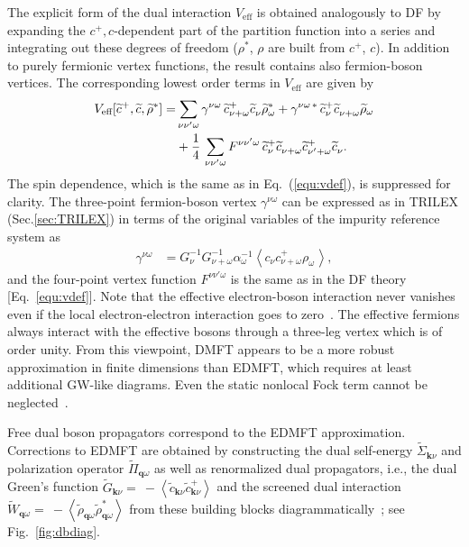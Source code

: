 \documentclass[rmp,aps,reprint,amsmath,amssymb,superscriptaddress,showpacs,nofootinbib]{revtex4-1}
\newcommand{\kv}{\ensuremath{\mathbf{k}}}
\newcommand{\qv}{\ensuremath{\mathbf{q}}}
\newcommand{\av}[1]{\ensuremath{\left\langle #1 \right\rangle}}
\begin{document}
The explicit form of the dual interaction $V_{\text{eff}}$ is obtained analogously to DF by expanding the $c^{+}, c$-dependent part of the partition function into a series and integrating out these degrees of freedom ($\rho^*$, $\rho$ are built from  $c^+$, $c$). In addition to purely fermionic vertex functions, the result contains also fermion-boson vertices. The corresponding lowest order terms in $V_{\text{eff}}$ are given by 
\begin{align}
  V_{\text{eff}}[\widetilde{c}^+,\widetilde{c},\widetilde{\rho}^*]
  =&\sum_{\nu\nu'\omega}\gamma^{\nu\omega}\,\widetilde{c}^+_{\nu+\omega}\widetilde{c}^{\phantom{*}}_{\nu} \widetilde{\rho}^{*}_{\omega} + \gamma^{\nu\omega\,*}\,\widetilde{c}^+_{\nu}\widetilde{c}^{\phantom{*}}_{\nu+\omega} \widetilde{\rho}_{\omega} \notag \\
  & +\frac14\,\sum_{\nu\nu'\omega}F^{\nu\nu'\omega}\,\widetilde{c}^{+}_{\nu}\widetilde{c}^{\phantom{*}}_{\nu+\omega}\widetilde{c}^{+}_{\nu'+\omega}\widetilde{c}^{\phantom{*}}_{\nu}.
\end{align}
The spin dependence, which is the same as in Eq.~(\ref{equ:vdef}), is suppressed for clarity. The three-point fermion-boson vertex $\gamma^{\nu\omega}$ can be expressed as in TRILEX (Sec.\ref{sec:TRILEX}) in terms of the original variables of the impurity reference system as~\cite{Ayral2016,Rohringer2016}
\begin{align}
\label{eq:3pvertex}
  \gamma^{\nu\omega}&=G^{-1}_{\nu}G^{-1}_{\nu+\omega}\alpha^{-1}_{\omega}\av{c^{\phantom{*}}_{\nu}c^{+}_{\nu+\omega}\rho^{\phantom{+}}_{\omega}},
\end{align}
and the four-point vertex function $F^{\nu\nu'\omega}$ is the same as in the DF theory [Eq.~\eqref{equ:vdef}].
Note that the effective electron-boson interaction never vanishes even if the local electron-electron interaction goes to zero~\cite{vanLoon2014a}. The effective fermions always interact with the effective bosons through a three-leg vertex which is of order unity. From this viewpoint, DMFT appears to be a more robust approximation in finite dimensions than EDMFT, which requires at least additional GW-like diagrams. Even the static nonlocal Fock term cannot be neglected~\cite{Ayral2017a}.

Free dual boson propagators correspond to the EDMFT approximation. Corrections to EDMFT are obtained by constructing the dual self-energy $\widetilde{\Sigma}_{\kv\nu}$ and polarization operator $\widetilde{\Pi}_{\qv\omega}$ as well as renormalized dual propagators, i.e., the dual Green's function $\widetilde{G}_{\kv\nu} =~ -\av{\widetilde{c}^{\phantom{+}}_{\kv\nu}\widetilde{c}^{+}_{\kv\nu}}$ and the screened dual interaction $\widetilde{W}_{\qv\omega} =~ -\av{ \widetilde{\rho}^{\phantom{*}}_{\qv\omega} \widetilde{\rho}^{*}_{\qv\omega}}$ from these building blocks diagrammatically~\cite{Rubtsov12, vanLoon2014a, Stepanov2016}; see Fig.~\ref{fig:dbdiag}.
\end{document}
